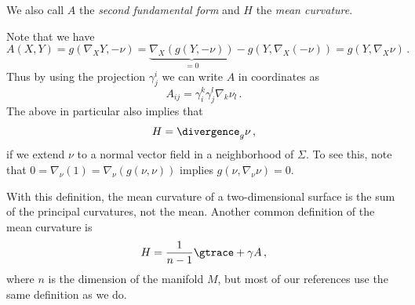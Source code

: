 \documentclass[titlepage,numbers=noenddot,oneside,%
cleardoublepage=empty,paper=a4,fontsize=11pt,%
english,%
]{scrartcl}
\newcommand*{\mathcomma}{\,,}
\newcommand*{\mathfullstop}{\,.}
\begin{document}
{\begin{definition}
\begin{equation}
    \end{equation}
    We also call \( A \) the \emph{second fundamental form} and \( H \) the \emph{mean curvature}. 
\end{definition}
Note that we have
\begin{equation*}
    A(X,Y)=g(\nabla_X Y,-\nu)=\underbrace{\nabla_X (g(Y,-\nu))}_{=0}-g(Y,\nabla_X (-\nu))=g(Y,\nabla_X \nu)\mathfullstop
\end{equation*}
Thus by using the projection \( \gamma^i_j \) we can write \( A \) in coordinates as
\begin{equation}
    A_{ij}=\gamma^k_i\gamma^l_j \nabla_k \nu_l\mathfullstop\label{eq:second_fundamental_form_in_coordinates}
\end{equation}
The above in particular also implies that
\begin{equation*}
    H=\divergence_g \nu\mathcomma
\end{equation*}
if we extend \( \nu \) to a normal vector field in a neighborhood of \( \Sigma \). To see this, note that \( 0=\nabla_\nu(1)=\nabla_{\nu}(g(\nu,\nu)) \) implies \( g(\nu,\nabla_\nu \nu)=0 \).
\begin{remark}\label{rem:mean_curvature_peculiarities}
    With this definition, the mean curvature of a two-dimensional surface is the sum of the principal curvatures, not the mean. Another common definition of the mean curvature is
    \begin{equation*}
        H=\frac{1}{n-1}\gtrace+{\gamma}{A}\mathcomma
    \end{equation*}
    where \( n \) is the dimension of the manifold \( M \), but most of our references use the same definition as we do.


\end{remark}}
\end{document}
